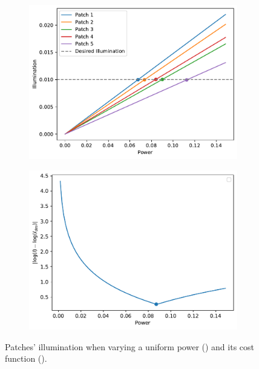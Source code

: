 \documentclass[11pt,a4paper]{article}
\begin{document}
\begin{figure}[!htb]
    \centering
    \begin{subfigure}[b]{0.46\textwidth}
        \includegraphics[width=\textwidth]{figures/uniform-power.pdf}
        \caption{}\label{fig:uniform-power-patches}
    \end{subfigure}
    \begin{subfigure}[b]{0.45\textwidth}
        \includegraphics[width=\textwidth]{figures/uniform-power-worst.pdf}
        \caption{}\label{fig:uniform-power-cost}
    \end{subfigure}
    \caption{Patches' illumination when varying a uniform power () and its cost function ().}\label{fig:uniform-power}
\end{figure}
\end{document}
